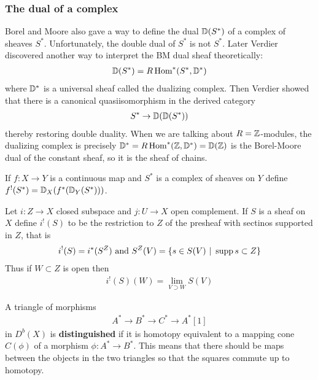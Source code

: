 \documentclass[12pt]{article}
\begin{document}
\subsubsection{The dual of a complex}
Borel and Moore also gave a way to define the dual $\mathbb{D}(S^*)$ of a complex of sheaves $S^*$.
Unfortunately, the double dual of $S^*$ is not $S^*$. Later
Verdier discovered another way to interpret the BM dual sheaf theoretically:
\begin{align*}
    \mathbb{D}(S^*) = R\operatorname{Hom}^*(S^*,\mathbb{D}^*)
\end{align*} where $\mathbb{D}^*$ is a universal sheaf called the dualizing complex. Then
Verdier showed that there is a canonical quasiisomorphism
in the derived category \begin{align*}
    S^* \to \mathbb{D}(\mathbb{D}(S^*))
\end{align*} thereby restoring double duality. When we are talking about $R=\mathbb{Z}$-modules,
the dualizing complex is precisely $\mathbb{D}^* =  R\operatorname{Hom}^*(\mathbb{Z},\mathbb{D}^*) = \mathbb{D}(\mathbb{Z})$ is the
Borel-Moore dual of the constant sheaf, so it is the sheaf of chains.

\begin{definition}
    If $f:X\to Y$ is a continuous map and $S^*$ is a complex of sheaves on $Y$
    define $f^!(S^*) = \mathbb{D}_X(f^*(\mathbb{D}_Y(S^*)))$.
\end{definition}

\begin{definition}
    Let $i:Z\to X$ closed subspace and $j:U\to X$ open complement.
    If $S$ is a sheaf on $X$ define $i^!(S)$ to be the restriction to $Z$ of the
    presheaf with sectinos supported in $Z$, that is \begin{align*}
        i^!(S) = i^*(S^Z) \text{ and } S^Z(V) = \{s\in S(V) \ \vert \  \operatorname{supp} s \subset Z\}
    \end{align*} Thus if $W\subset Z$ is open then \begin{align*}
        i^!(S)(W) = \lim_{V\supset W} S(V)
    \end{align*}
\end{definition}

\begin{definition}
    A triangle of morphisms
    \begin{align*}
        A^* \to B^* \to C^* \to A^*[1]
    \end{align*} in $D^b(X)$ is \textbf{distinguished} if it is homotopy equivalent to a mapping cone
    $C(\phi)$ of a morphism $\phi:A^*\to B^*$. This means that there should be maps between
    the objects in the two triangles so that the squares commute up to homotopy.
\end{definition}
\end{document}
